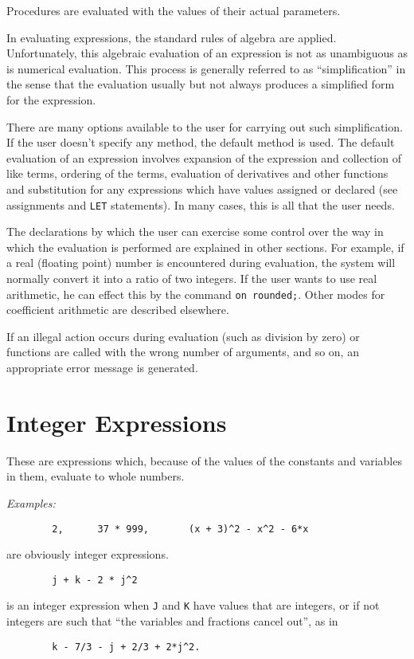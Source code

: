 \documentclass[11pt,letterpaper]{book}
\makeatletter
\newcommand{\underscore}{\_}
\newcommand{\ttindex}[1]{{\renewcommand{\_}{\protect\underscore}%
                          \index{#1@{\tt #1}}}}
\makeatother
\begin{document}
Procedures are evaluated with the values of their actual parameters.

In evaluating expressions, the standard rules of algebra are applied.
Unfortunately, this algebraic evaluation of an expression is not as
unambiguous as is numerical evaluation. This process is generally referred
to as ``simplification'' in the sense that the
evaluation usually but not always produces a simplified form for the
expression.

There are many options available to the user for carrying out such
simplification.  If the user doesn't specify any
method, the default method is used.  The default evaluation of an
expression involves expansion of the expression and collection of like
terms, ordering of the terms, evaluation of derivatives and other
functions and substitution for any expressions which have values assigned
or declared (see assignments and {\tt LET} statements).  In many cases,
this is all that the user needs.

The declarations by which the user can exercise some control over the way
in which the evaluation is performed are explained in other sections.  For
example, if a real (floating point) number is encountered during
evaluation, the system will normally convert it into a ratio of two
integers.  If the user wants to use real arithmetic, he can effect this by
the command {\tt on rounded;}.\ttindex{ROUNDED} Other modes for
coefficient arithmetic are described elsewhere.

If an illegal action occurs during evaluation (such as division by zero)
or functions are called with the wrong number of arguments, and so on, an
appropriate error message is generated.

\section{Integer Expressions}

These are expressions which, because of the values of the
constants and variables in them, evaluate to whole numbers.

{\it Examples:}
{\small\begin{verbatim}
        2,      37 * 999,       (x + 3)^2 - x^2 - 6*x
\end{verbatim}}
are obviously integer expressions.
{\small\begin{verbatim}
        j + k - 2 * j^2
\end{verbatim}}
is an integer expression when {\tt J} and {\tt K} have values that are
integers, or if not integers are such that ``the variables and fractions
cancel out'', as in
{\small\begin{verbatim}
        k - 7/3 - j + 2/3 + 2*j^2.
\end{verbatim}}
\end{document}
